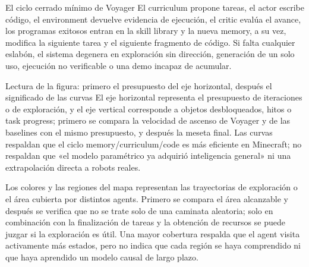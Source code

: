 \begin{importantbox}{El ciclo cerrado mínimo de Voyager}
El curriculum propone tareas, el actor escribe código, el environment devuelve evidencia de ejecución, el critic evalúa el avance, los programas exitosos entran en la skill library y la nueva memory, a su vez, modifica la siguiente tarea y el siguiente fragmento de código. Si falta cualquier eslabón, el sistema degenera en exploración sin dirección, generación de un solo uso, ejecución no verificable o una demo incapaz de acumular.
\end{importantbox}


\begin{knowledgebox}{Lectura de la figura: primero el presupuesto del eje horizontal, después el significado de las curvas}
El eje horizontal representa el presupuesto de iteraciones o de exploración, y el eje vertical corresponde a objetos desbloqueados, hitos o task progress; primero se compara la velocidad de ascenso de Voyager y de las baselines con el mismo presupuesto, y después la meseta final. Las curvas respaldan que el ciclo memory/curriculum/code es más eficiente en Minecraft; no respaldan que «el modelo paramétrico ya adquirió inteligencia general» ni una extrapolación directa a robots reales.
\end{knowledgebox}


Los colores y las regiones del mapa representan las trayectorias de exploración o el área cubierta por distintos agents. Primero se compara el área alcanzable y después se verifica que no se trate solo de una caminata aleatoria; solo en combinación con la finalización de tareas y la obtención de recursos se puede juzgar si la exploración es útil. Una mayor cobertura respalda que el agent visita activamente más estados, pero no indica que cada región se haya comprendido ni que haya aprendido un modelo causal de largo plazo.


